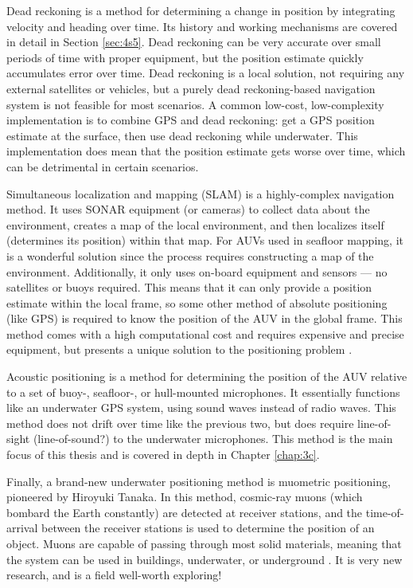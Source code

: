 \documentclass[11pt]{ucthesisCP}
\begin{document}
Dead reckoning is a method for determining a change in position by integrating velocity and heading over time. Its history and working mechanisms are covered in detail in Section \ref{sec:4s5}. Dead reckoning can be very accurate over small periods of time with proper equipment, but the position estimate quickly accumulates error over time. Dead reckoning is a local solution, not requiring any external satellites or vehicles, but a purely dead reckoning-based navigation system is not feasible for most scenarios. A common low-cost, low-complexity implementation is to combine GPS and dead reckoning: get a GPS position estimate at the surface, then use dead reckoning while underwater. This implementation does mean that the position estimate gets worse over time, which can be detrimental in certain scenarios.

Simultaneous localization and mapping (SLAM) is a highly-complex navigation method. It uses SONAR equipment (or cameras) to collect data about the environment, creates a map of the local environment, and then localizes itself (determines its position) within that map. For AUVs used in seafloor mapping, it is a wonderful solution since the process requires constructing a map of the environment. Additionally, it only uses on-board equipment and sensors --- no satellites or buoys required. This means that it can only provide a position estimate within the local frame, so some other method of absolute positioning (like GPS) is required to know the position of the AUV in the global frame. This method comes with a high computational cost and requires expensive and precise equipment, but presents a unique solution to the positioning problem \cite{surveyurpn}.

Acoustic positioning is a method for determining the position of the AUV relative to a set of buoy-, seafloor-, or hull-mounted microphones. It essentially functions like an underwater GPS system, using sound waves instead of radio waves. This method does not drift over time like the previous two, but does require line-of-sight (line-of-sound?) to the underwater microphones. This method is the main focus of this thesis and is covered in depth in Chapter \ref{chap:3c}.

Finally, a brand-new underwater positioning method is muometric positioning, pioneered by Hiroyuki Tanaka. In this method, cosmic-ray muons (which bombard the Earth constantly) are detected at receiver stations, and the time-of-arrival between the receiver stations is used to determine the position of an object. Muons are capable of passing through most solid materials, meaning that the system can be used in buildings, underwater, or underground \cite{muons}. It is very new research, and is a field well-worth exploring!
\end{document}

